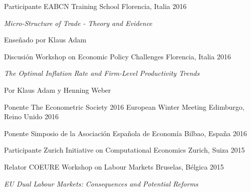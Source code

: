 

\begin{cventries}

\cventry
    {Participante} %
    {EABCN Training School} %
    {Florencia, Italia} %
    {2016} %
    {
        \begin{cvitems} %
            \item {\textit{Micro-Structure of Trade - Theory and Evidence}}
            \item {Enseñado por Klaus Adam}
        \end{cvitems}
    }

\cventry
    {Discusión} %
    {Workshop on Economic Policy Challenges} %
    {Florencia, Italia} %
    {2016} %
    {
        \begin{cvitems} %
            \item {\textit{The Optimal Inflation Rate and Firm-Level Productivity Trends}}
            \item {Por Klaus Adam y Henning Weber}
        \end{cvitems}
    }

\cventry
    {Ponente} %
    {The Econometric Society 2016 European Winter Meeting} %
    {Edimburgo, Reino Unido} %
    {2016} %
    {}

\cventry
    {Ponente} %
    {Simposio de la Asociación Española de Economía} %
    {Bilbao, España} %
    {2016} %
    {}

\cventry
    {Participante} %
    {Zurich Initiative on Computational Economics} %
    {Zurich, Suiza} %
    {2015} %
    {}

\cventry
    {Relator} %
    {COEURE Workshop on Labour Markets} %
    {Bruselas, Bélgica} %
    {2015} %
    {
      \begin{cvitems} %
        \item {\textit{EU Dual Labour Markets: Consequences and Potential Reforms}}
      \end{cvitems}
    }

\end{cventries}

